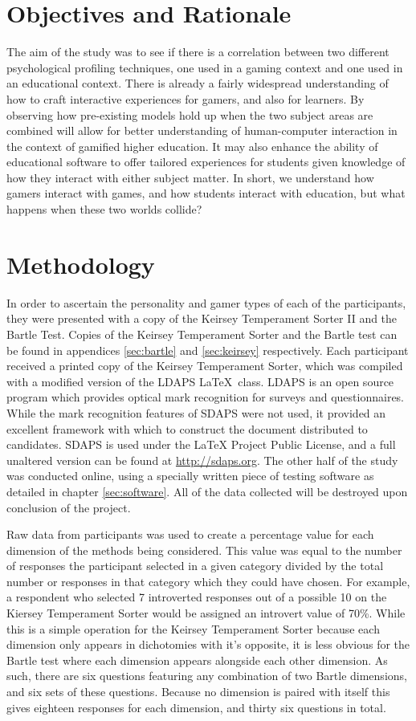 \documentclass[12pt,a4paper,twoside]{report}
\begin{document}
\section{Objectives and Rationale}
The aim of the study was to see if there is a correlation between two different psychological profiling techniques, one used in a gaming context and one used in an educational context. There is already a fairly widespread understanding of how to craft interactive experiences for gamers, and also for learners. By observing how pre-existing models hold up when the two subject areas are combined will allow for better understanding of human-computer interaction in the context of gamified higher education. It may also enhance the ability of educational software to offer tailored experiences for students given knowledge of how they interact with either subject matter. In short, we understand how gamers interact with games, and how students interact with education, but what happens when these two worlds collide?

\section{Methodology}
In order to ascertain the personality and gamer types of each of the participants, they were presented with a copy of the Keirsey Temperament Sorter II and the Bartle Test. Copies of the Keirsey Temperament Sorter and the Bartle test can be found in appendices \ref{sec:bartle} and \ref{sec:keirsey} respectively. Each participant received a printed copy of the Keirsey Temperament Sorter, which was compiled with a modified version of the LDAPS  \LaTeX \ class. LDAPS is an open source program which provides optical mark recognition for surveys and questionnaires. While the mark recognition features of SDAPS were not used, it provided an excellent framework with which to construct the document distributed to candidates. SDAPS is used under the LaTeX Project Public License, and a full unaltered version can be found at \url{http://sdaps.org}. The other half of the study was conducted online, using a specially written piece of testing software as detailed in chapter \ref{sec:software}. All of the data collected will be destroyed upon conclusion of the project.

Raw data from participants was used to create a percentage value for each dimension of the methods being considered. This value was equal to the number of responses the participant selected in a given category divided by the total number or responses in that category which they could have chosen. For example, a respondent who selected 7 introverted responses out of a possible 10 on the Kiersey Temperament Sorter would be assigned an introvert value of 70\%. While this is a simple operation for the Keirsey Temperament Sorter because each dimension only appears in dichotomies with it's opposite, it is less obvious for the Bartle test where each dimension appears alongside each other dimension. As such, there are six questions featuring any combination of two Bartle dimensions, and six sets of these questions. Because no dimension is paired with itself this gives eighteen responses for each dimension, and thirty six questions in total.
\end{document}
